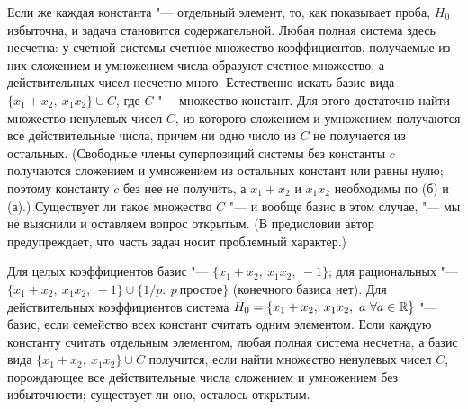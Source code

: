 \begin{solution}[7 (\S\,4)]
Если же каждая константа "--- отдельный элемент, то, как показывает проба,
$H_0$ избыточна, и задача становится содержательной. Любая полная
система здесь несчетна: у счетной системы счетное множество коэффициентов,
получаемые из них сложением и умножением числа образуют счетное множество,
а действительных чисел несчетно много. Естественно искать базис вида
$\{x_1+x_2,\ x_1x_2\}\cup C$, где $C$ "--- множество констант. Для этого
достаточно найти множество ненулевых чисел $C$, из которого сложением и
умножением получаются все действительные числа, причем ни одно число из $C$
не получается из остальных. (Свободные члены суперпозиций системы без
константы $c$ получаются сложением и умножением из остальных констант или
равны нулю; поэтому константу $c$ без нее не получить, а $x_1+x_2$ и
$x_1x_2$ необходимы по (б) и (а).) Существует ли такое множество $C$ "--- и
вообще базис в этом случае, "--- мы не выяснили и оставляем вопрос
открытым. (В предисловии автор предупреждает, что часть задач носит
проблемный характер.)

\answer Для целых коэффициентов базис "--- $\{x_1+x_2,\ x_1x_2,\ -1\}$;
для рациональных "--- $\{x_1+x_2,\ x_1x_2,\ -1\}\cup\{1/p:\ p\
\text{простое}\}$ (конечного базиса нет). Для действительных коэффициентов
система $H_0=\{x_1+x_2,\ x_1x_2,\ a\ \forall a\in\mathbb R\}$ "--- базис, если
семейство всех констант считать одним элементом. Если каждую константу
считать отдельным элементом, любая полная система несчетна, а базис вида
$\{x_1+x_2,\ x_1x_2\}\cup C$ получится, если найти множество ненулевых чисел
$C$, порождающее все действительные числа сложением и умножением без
избыточности; существует ли оно, осталось открытым.
\end{solution}
